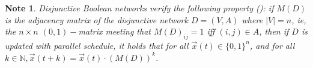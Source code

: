 \documentclass[preprint,12pt]{elsarticle}
\newtheorem{note}{Note}
\begin{document}
\begin{note}\label{rel-mat-net}
Disjunctive Boolean networks verify the following property (\cite{disj}): if $M(D)$ is the adjacency matrix of the disjunctive network $D=(V,A)$ where $|V|=n$, ie, the $n\times n$ $(0,1)-$matrix meeting that $M(D)_{ij}=1$ iff $(i,j)\in A$, then if $D$ is updated with parallel schedule, it holds that for all $\vec{x}(t) \in \{0,1\}^n$, and for all $k \in \mathbb{N},\vec{x}(t+k)=\vec{x}(t) \cdot (M(D))^k$. %
\end{note}
\end{document}
